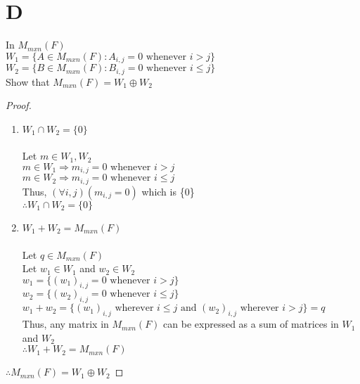 \documentclass[11pt]{scrartcl}
\begin{document}
\section{D}
In $M_{mxn}(F)$\\
$W_1 = \{A\in M_{mxn}(F): A_{i,j} = 0 \text{ whenever }i>j\}$\\
$W_2 = \{B\in M_{mxn}(F): B_{i,j} = 0 \text{ whenever }i \leq j\}$\\
Show that $M_{mxn}(F) = W_1 \oplus W_2$
\begin{proof}
\-\
\begin{enumerate}[label=\alph*.]
	\item{
			$W_1 \cap W_2 = \{0\}$\\
			\-\\ Let $m \in W_1, W_2$\\
			$m \in W_1 \Rightarrow m_{i,j} = 0 \text{ whenever }i>j$\\
			$m \in W_2 \Rightarrow m_{i,j} = 0 \text{ whenever }i \leq j$\\
			Thus, $(\forall i,j)(m_{i,j} = 0)$ which is \{0\}\\
			$\therefore W_1 \cap W_2 = \{0\}$\\
		}	
	\item{
			$W_1 + W_2 = M_{mxn}(F)$\\
			\-\\ Let $q \in M_{mxn}(F)$\\
			Let $w_1 \in W_1$ and $w_2 \in W_2$\\
			$w_1 = \{(w_1)_{i,j} = 0 \text{ whenever }i>j \}$\\ 
			$w_2 = \{(w_2)_{i,j} = 0 \text{ whenever }i\leq j \}$\\ 
			$w_1 + w_2 = \{(w_1)_{i,j} \text{ wherever } i \leq j \text{ and } (w_2)_{i,j} \text{ wherever } i>j \} = q$\\
			Thus, any matrix in $M_{mxn}(F)$ can be expressed as a sum of matrices in $W_1$ and $W_2$\\
			$\therefore W_1 + W_2 = M_{mxn}(F)$
		}	
\end{enumerate}
$\therefore M_{mxn}(F) = W_1 \oplus W_2$
\end{proof}
\end{document}
